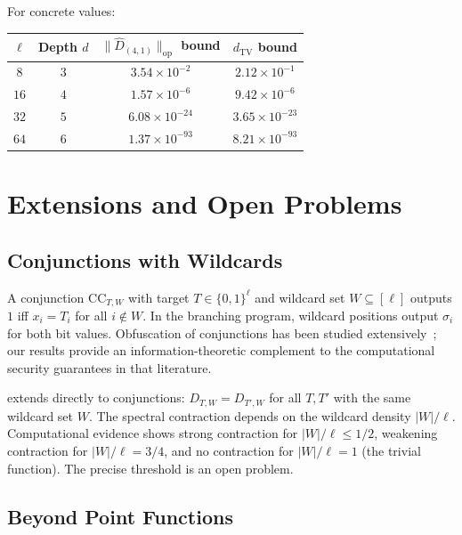 \documentclass[version=submission]{iacrcc}
\newcommand{\norm}[1]{\lVert #1 \rVert}
\newcommand{\opn}[1]{\norm{#1}_{\mathrm{op}}}
\newcommand{\dtv}{d_{\mathrm{TV}}}
\newcommand{\Dhat}{\widehat{D}}
\newcommand{\CC}{\mathrm{CC}}
\begin{document}
For concrete values:
\begin{center}
\begin{tabular}{cccc}
\toprule
$\ell$ & Depth $d$ & $\opn{\Dhat_{(4,1)}}$ bound & $\dtv$ bound \\
\midrule
$8$   & $3$ & $3.54 \times 10^{-2}$ & $2.12 \times 10^{-1}$ \\
$16$  & $4$ & $1.57 \times 10^{-6}$ & $9.42 \times 10^{-6}$ \\
$32$  & $5$ & $6.08 \times 10^{-24}$ & $3.65 \times 10^{-23}$ \\
$64$  & $6$ & $1.37 \times 10^{-93}$ & $8.21 \times 10^{-93}$ \\
\bottomrule
\end{tabular}
\end{center}


\section{Extensions and Open Problems}
\label{sec:extensions}

\subsection{Conjunctions with Wildcards}

A conjunction $\CC_{T,W}$ with target $T \in \{0,1\}^\ell$ and wildcard set
$W \subseteq [\ell]$ outputs $1$ iff $x_i = T_i$ for all $i \notin W$.
In the branching program, wildcard positions output $\sigma_i$ for both
bit values.  Obfuscation of conjunctions has been studied
extensively~\cite{BVWW16,BKMPRS18,BLMZ19}; our results provide an
information-theoretic complement to the computational security guarantees
in that literature.

 extends directly to conjunctions:
$D_{T,W} = D_{T',W}$ for all $T, T'$ with the same wildcard set $W$.
The spectral contraction depends on the wildcard density $|W|/\ell$.
Computational evidence shows strong contraction for $|W|/\ell \leq 1/2$,
weakening contraction for $|W|/\ell = 3/4$, and no contraction for $|W|/\ell = 1$
(the trivial function). The precise threshold is an open problem.


\subsection{Beyond Point Functions}
\end{document}
